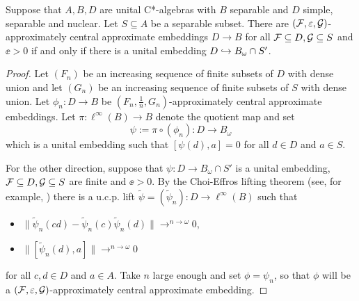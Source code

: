 \documentclass[12pt]{amsart}
\begin{document}
    \begin{lemma}\label{lem:local-equiv-global}
      Suppose that $A,B,D$ are unital C*-algebras with $B$ separable and $D$ simple, separable and nuclear. Let $S \subseteq A$ be a separable subset. There are $(\mathcal{F},\varepsilon,\mathcal{G})$-approximately central approximate embeddings $D \to B$ for all $\mathcal{F} \subseteq D, \mathcal{G} \subseteq S$ and $\ee > 0$ if and only if there is a unital embedding $D \hookrightarrow B_\omega \cap S'$.
        \begin{proof}
          Let $(F_n)$ be an increasing sequence of finite subsets of $D$ with dense union and let $(G_n)$ be an increasing sequence of finite subsets of $S$ with dense union. Let $\phi_n: D \to B$ be  $(F_n,\frac{1}{n},G_n)$-approximately central approximate embeddings. Let $\pi: \ell^{\infty}(B) \to B$ denote the quotient map and set
          \begin{equation}
                     \psi := \pi \circ (\phi_n): D \to B_\omega
\end{equation} 
              which is a unital embedding such that $[\psi(d),a] = 0$ for  all $d \in D$ and $a \in S$. 

          For the other direction, suppose that $\psi: D \to B_\omega \cap S'$ is a unital embedding, $\mathcal{F} \subseteq D,\mathcal{G} \subseteq S$ are finite and $\ee >0$. By the Choi-Effros lifting theorem (see, for example, \cite[Theorem C.3]{BrownOzawa}) there is a u.c.p. lift $\tilde{\psi} = (\tilde{\psi}_n): D \to \ell^{\infty}(B)$ such that
            \begin{itemize}
              \item $\|\tilde{\psi}_n(cd) - \tilde{\psi}_n(c)\tilde{\psi}_n(d)\| \to^{n \to \omega} 0$,
              \item $\|[\tilde{\psi}_n(d),a]\| \to^{n \to \omega} 0$ 
            \end{itemize}
            for all $c,d \in D$ and $a \in A$. Take $n$ large enough and set $\phi = \psi_n$, so that $\phi$ will be a $(\mathcal{F},\varepsilon,\mathcal{G})$-approximately central approximate embedding. 
        \end{proof}
    \end{lemma}
\end{document}
